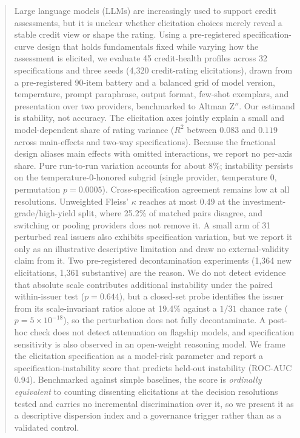 \documentclass[a4paper,fleqn]{cas-sc}
\begin{document}
\begin{abstract}
Large language models (LLMs) are increasingly used to support credit assessments, but it is unclear
whether elicitation choices merely reveal a stable credit view or shape the rating. Using a pre-registered
specification-curve design that holds fundamentals fixed while varying how the assessment is elicited, we
evaluate 45 credit-health profiles across 32 specifications and three seeds (4{,}320 credit-rating
elicitations), drawn from a pre-registered 90-item battery and a balanced grid of model version,
temperature, prompt paraphrase, output format, few-shot exemplars, and presentation over two providers,
benchmarked to Altman Z$''$. Our estimand is stability,
not accuracy. The elicitation axes
jointly explain a small and model-dependent share of rating variance ($R^2$ between $0.083$ and
$0.119$ across main-effects and two-way specifications). Because the fractional design aliases main
effects with omitted interactions, we report no per-axis share. Pure run-to-run variation accounts
for about 8\%; instability persists on the
temperature-0-honored subgrid (single provider,
temperature 0, permutation $p=0.0005$). Cross-specification agreement remains low at all resolutions. Unweighted Fleiss' $\kappa$ reaches at most 0.49 at the investment-grade/high-yield split, where 25.2\% of
matched pairs disagree, and switching or pooling providers does not remove it. A small arm of 31 perturbed real issuers also exhibits specification variation, but we report it only as an illustrative descriptive limitation and draw
no external-validity claim from it. Two pre-registered decontamination experiments
(1{,}364 new elicitations, 1{,}361 substantive) are the reason. We do not detect evidence that absolute scale contributes additional
instability under the paired within-issuer test ($p=0.644$), but a closed-set probe identifies the
issuer from its scale-invariant ratios alone at 19.4\% against a $1/31$ chance rate
($p=5{\times}10^{-18}$), so the perturbation does not fully decontaminate. A post-hoc check does not detect attenuation on flagship
models, and specification sensitivity is also observed in an open-weight reasoning model. We frame the
elicitation specification as a model-risk parameter and report a specification-instability score that
predicts held-out instability (ROC-AUC 0.94). Benchmarked against simple
baselines, the score is \emph{ordinally equivalent} to counting dissenting elicitations at the
decision resolutions tested and carries no incremental discrimination over it, so we present it as a
descriptive dispersion index and a governance trigger rather than as a validated control.
\end{abstract}
\end{document}
